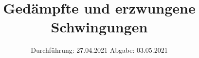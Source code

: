 

\subject{V354}
\title{Gedämpfte und erzwungene Schwingungen}
\date{%
  Durchführung: 27.04.2021
  \hspace{3em}
  Abgabe: 03.05.2021
}



\maketitle
\thispagestyle{empty}
\tableofcontents
\newpage







\printbibliography{}


